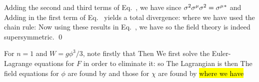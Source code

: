 \documentclass[11pt]{article}
\begin{document}
{	
	Adding the second and third terms of Eq.~, we have
	since $\sigma^2 \sigma^\mu \sigma^2 = \sigma^\mu{}^*$ and
	Adding in the first term of Eq.~ yields a total divergence:
	where we have used the chain rule:
	Now using these results in Eq.~, we have
	so the field theory is indeed supersymmetric. \qed
	
	For $n = 1$ and $W = g \phi^3 / 3$, note firstly that
	Then
	We first solve the Euler-Lagrange equations for $F$ in order to eliminate it:
	so
	The Lagrangian is then
	The field equations for $\phi$ are found by
	and those for $\chi$ are found by
	\hl{ where we have }
}
\end{document}
